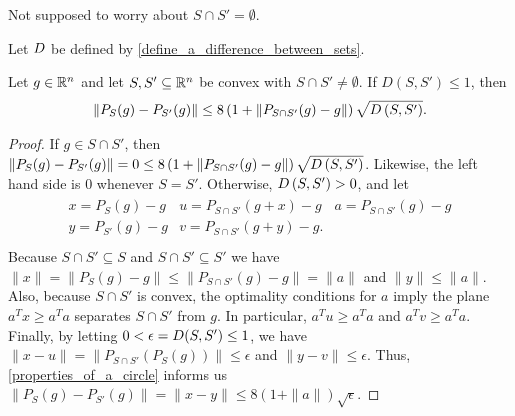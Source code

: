 \begin{boxedcomment}
Not supposed to worry about $S \cap S' = \emptyset$.
\end{boxedcomment}

\begin{lemma}
\label{board_tied_to_sphere}
Let ${D}$ be defined by \cref{define_a_difference_between_sets}.

Let $g \in \mathbb R^n$ and let $S, S' \subseteq \mathbb R^n$ be convex with $S \cap S' \ne \emptyset$.
If $D\left(S, S'\right) \le 1$, then 
\begin{align*}
\|P_{S}(g) - P_{S'}(g)\| \le 8\left(1 + \|P_{S \cap S'}(g) - g\|\right) \sqrt{{D}\left(S, S'\right)}.
\end{align*}
\end{lemma}
\begin{proof}


If $g \in S \cap S'$, then $\left\|P_S(g) - P_{S'}(g)\right\| = 0 \le 8\left(1 + \|P_{S \cap S'}(g) - g\|\right) \sqrt{{D}\left(S, S'\right)}$.
Likewise, the left hand side is $0$ whenever $S = S'$.
Otherwise, ${D}\left(S, S'\right) > 0$, and let 
\begin{align*}
\begin{array}{ccc}
x = P_S(g) - g      & u = P_{S \cap S'}(g + x) - g & a = P_{S \cap S'}(g) - g \\
y = P_{S'}(g) - g   & v = P_{S \cap S'}(g + y) - g. &  \\
\end{array}
\end{align*}
Because $S \cap S' \subseteq S$ and $S \cap S' \subseteq S'$ we have
$\|x\| = \|P_S(g) - g\| \le \|P_{S \cap S'} (g) - g\| = \|a\|$ and $\|y\| \le \|a\|$.
Also, because $S \cap S'$ is convex, the optimality conditions for $a$ imply the plane $a^Tx \ge a^Ta$ separates $S \cap S'$ from $g$.
In particular, $a^Tu \ge a^Ta$ and $a^Tv \ge a^Ta$.
Finally, by letting $0 < \epsilon = {D}(S, S') \le 1$, we have $\|x - u\| = \|P_{S \cap S'}\left(P_S(g)\right)\| \le \epsilon$ and $\|y - v\| \le \epsilon$.
Thus, \cref{properties_of_a_circle} informs us
$\|P_S(g) - P_{S'}(g)\| = \|x - y\| \le 8(1 + \|a\|) \sqrt{\epsilon}$.
\end{proof}


